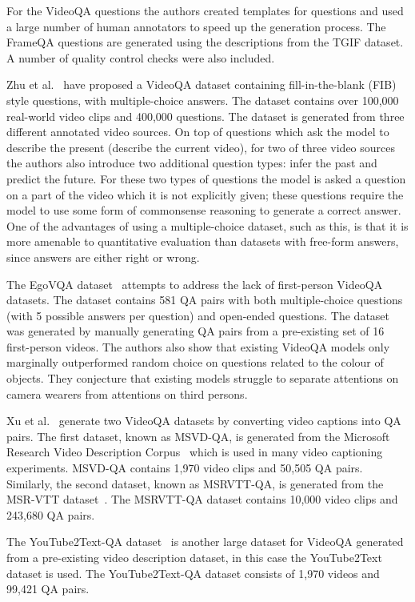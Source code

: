 \documentclass[../interim.tex]{subfiles}
\begin{document}
For the VideoQA questions the authors created templates for questions and used a large number of human annotators to speed up the generation process. The FrameQA questions are generated using the descriptions from the TGIF dataset. A number of quality control checks were also included.

Zhu et al.~\cite{dataset:zhu} have proposed a VideoQA dataset containing fill-in-the-blank (FIB) style questions, with multiple-choice answers. The dataset contains over 100,000 real-world video clips and 400,000 questions. The dataset is generated from three different annotated video sources. On top of questions which ask the model to describe the present (describe the current video), for two of three video sources the authors also introduce two additional question types: infer the past and predict the future. For these two types of questions the model is asked a question on a part of the video which it is not explicitly given; these questions require the model to use some form of commonsense reasoning to generate a correct answer. One of the advantages of using a multiple-choice dataset, such as this, is that it is more amenable to quantitative evaluation than datasets with free-form answers, since answers are either right or wrong.

The EgoVQA dataset~\cite{dataset:ego-vqa} attempts to address the lack of first-person VideoQA datasets. The dataset contains 581 QA pairs with both multiple-choice questions (with 5 possible answers per question) and open-ended questions. The dataset was generated by manually generating QA pairs from a pre-existing set of 16 first-person videos. The authors also show that existing VideoQA models only marginally outperformed random choice on questions related to the colour of objects. They conjecture that existing models struggle to separate attentions on camera wearers from attentions on third persons.

Xu et al.~\cite{dataset:xu} generate two VideoQA datasets by converting video captions into QA pairs. The first dataset, known as MSVD-QA, is generated from the Microsoft Research Video Description Corpus~\cite{dataset:msvd} which is used in many video captioning experiments. MSVD-QA contains 1,970 video clips and 50,505 QA pairs. Similarly, the second dataset, known as MSRVTT-QA, is generated from the MSR-VTT dataset~\cite{dataset:msr-vtt}. The MSRVTT-QA dataset contains 10,000 video clips and 243,680 QA pairs.

The YouTube2Text-QA dataset~\cite{dataset:youtube2text-qa} is another large dataset for VideoQA generated from a pre-existing video description dataset, in this case the YouTube2Text~\cite{dataset:youtube2text} dataset is used. The YouTube2Text-QA dataset consists of 1,970 videos and 99,421 QA pairs.
\end{document}
